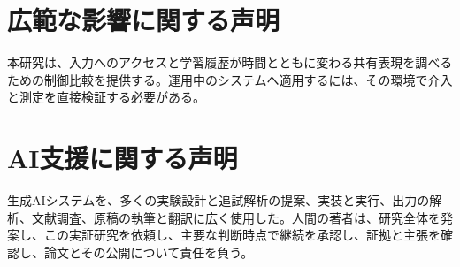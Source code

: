 \section*{広範な影響に関する声明}
本研究は、入力へのアクセスと学習履歴が時間とともに変わる共有表現を調べるための制御比較を提供する。運用中のシステムへ適用するには、その環境で介入と測定を直接検証する必要がある。

\section*{AI支援に関する声明}
生成AIシステムを、多くの実験設計と追試解析の提案、実装と実行、出力の解析、文献調査、原稿の執筆と翻訳に広く使用した。人間の著者は、研究全体を発案し、この実証研究を依頼し、主要な判断時点で継続を承認し、証拠と主張を確認し、論文とその公開について責任を負う。



\FloatBarrier
\appendix

